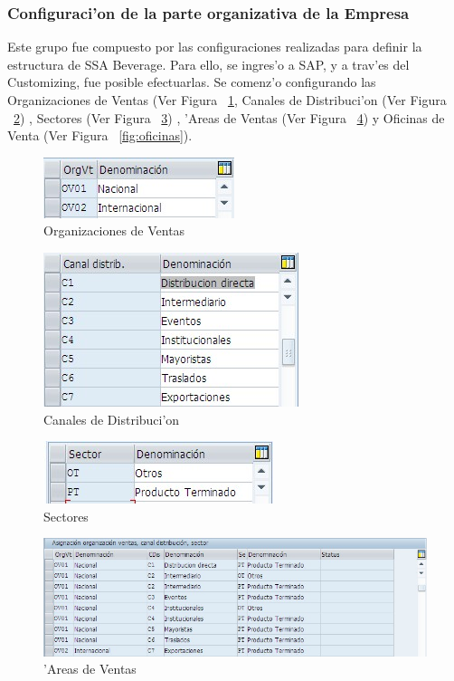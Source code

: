 \subsubsection{Configuraci'on de la parte organizativa de la Empresa}
	Este grupo fue compuesto por las configuraciones realizadas para definir la estructura de SSA Beverage. Para ello, se ingres'o a SAP, y a trav'es del Customizing, fue posible efectuarlas. Se comenz'o configurando las Organizaciones de Ventas (Ver Figura ~\ref{fig:organizaciones}, Canales de Distribuci'on (Ver Figura ~\ref{fig:canales}) , Sectores (Ver Figura ~\ref{fig:sectores}) , 'Areas de Ventas (Ver Figura ~\ref{fig:areas}) y Oficinas de Venta (Ver Figura ~\ref{fig:oficinas}).
\begin{figure}[H]
\centering
\includegraphics[scale=0.65,type=jpg,ext=.jpg,read=.jpg]{figures/OrgVentas}
\caption{Organizaciones de Ventas}
\label{fig:organizaciones}
\end{figure}
\begin{figure}[H]
\centering
\includegraphics[scale=0.65,type=jpg,ext=.jpg,read=.jpg]{figures/CanalesDistribucion}
\caption{Canales de Distribuci'on}
\label{fig:canales}
\end{figure}
\begin{figure}[H]
\centering
\includegraphics[scale=0.65,type=jpg,ext=.jpg,read=.jpg]{figures/Sectores}
\caption{Sectores}
\label{fig:sectores}
\end{figure}
\begin{figure}[H]
\centering
\includegraphics[scale=0.65,type=jpg,ext=.jpg,read=.jpg]{figures/AreaVentas}
\caption{'Areas de Ventas}
\label{fig:areas}
\end{figure}
